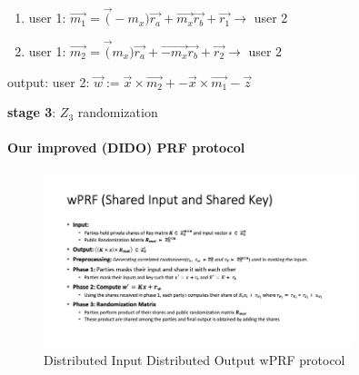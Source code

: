 \begin{algorithm}
\begin{algorithmic}
\begin{enumerate}
			\item user 1:  $  \vec{m_1} = \vec(- m_x)  \vec{r_a} + \vec{m_x} \vec{r_b} + \vec{r_1}   \rightarrow $   user 2
			
			\item user 1:  $  \vec{m_2} = \vec(m_x)  \vec{r_a} + \vec{- m_x} \vec{r_b} + \vec{r_2}  \rightarrow $   user 2
			
			
		\end{enumerate}
		
		output:  user 2: $\vec{w}:= \vec{x} \times \vec{m_2}+ - \vec{x}  \times \vec{m_1} - \vec{z}$
		
		
		\STATE  \textbf{stage 3}: $Z_3$ randomization  
		
	\end{algorithmic}
	
\end{algorithm}





\paragraph{Our improved (DIDO) PRF protocol}

\begin{figure}[ht]
	\centering
	\includegraphics[width=0.8\textwidth]{images/sisk.jpg}
	\vspace{-2mm}
	\caption{Distributed Input Distributed Output wPRF protocol}
	\label{sisk.fig}
	\vspace{-5mm}
\end{figure}

